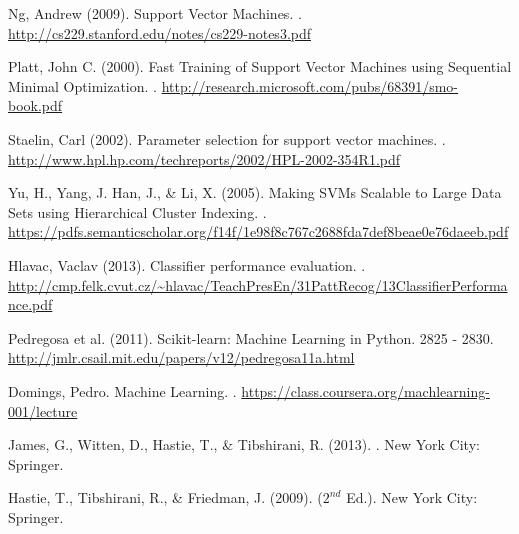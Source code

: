\documentclass[twoside]{article}
\begin{document}
\begin{thebibliography}{99}
 Ng, Andrew (2009).
\newblock Support Vector Machines.
. 
\url{http://cs229.stanford.edu/notes/cs229-notes3.pdf}
\href{http://cs229.stanford.edu/notes/cs229-notes3.pdf}{}

 Platt, John C. (2000).
\newblock Fast Training of Support Vector Machines using Sequential Minimal Optimization.
. 
\url{http://research.microsoft.com/pubs/68391/smo-book.pdf}
\href{http://research.microsoft.com/pubs/68391/smo-book.pdf}{}

 Staelin, Carl (2002).
\newblock Parameter selection for support vector machines.
. 
\url{http://www.hpl.hp.com/techreports/2002/HPL-2002-354R1.pdf}
\href{http://www.hpl.hp.com/techreports/2002/HPL-2002-354R1.pdf}{}

Yu, H., Yang, J. Han, J., \& Li, X. (2005).
\newblock Making SVMs Scalable to Large Data Sets using Hierarchical Cluster Indexing.
. 
\url{https://pdfs.semanticscholar.org/f14f/1e98f8c767c2688fda7def8beae0e76daeeb.pdf}
\href{https://pdfs.semanticscholar.org/f14f/1e98f8c767c2688fda7def8beae0e76daeeb.pdf}{}

 Hlavac, Vaclav (2013).
\newblock Classifier performance evaluation.
. 
\url{http://cmp.felk.cvut.cz/~hlavac/TeachPresEn/31PattRecog/13ClassifierPerformance.pdf}
\href{http://cmp.felk.cvut.cz/~hlavac/TeachPresEn/31PattRecog/13ClassifierPerformance.pdf}{}

Pedregosa et al. (2011).
\newblock Scikit-learn: Machine Learning in Python.
 2825 - 2830. 
\url{http://jmlr.csail.mit.edu/papers/v12/pedregosa11a.html}
\href{http://jmlr.csail.mit.edu/papers/v12/pedregosa11a.html}{}

Domings, Pedro.
\newblock Machine Learning.
. 
\url{https://class.coursera.org/machlearning-001/lecture}
\href{https://class.coursera.org/machlearning-001/lecture}{}
 
James, G., Witten, D., Hastie, T., \& Tibshirani, R. (2013).
. New York City: Springer.
 
Hastie, T., Tibshirani, R., \& Friedman, J. (2009).
 ($2^{nd}$ Ed.). New York City: Springer.

\end{thebibliography}


\end{document}
